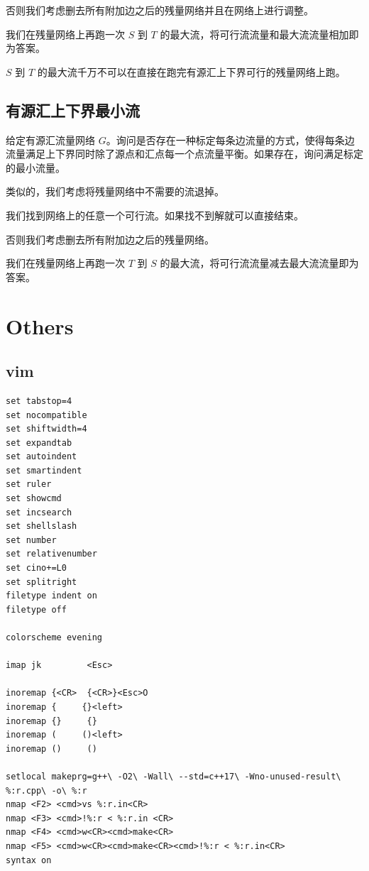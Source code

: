 \documentclass[9pt,landscape]{article}
\begin{document}
\begin{multicols}{2}
否则我们考虑删去所有附加边之后的残量网络并且在网络上进行调整。

我们在残量网络上再跑一次 $S$ 到 $T$ 的最大流，将可行流流量和最大流流量相加即为答案。

$S$ 到 $T$ 的最大流千万不可以在直接在跑完有源汇上下界可行的残量网络上跑。

\subsection{有源汇上下界最小流}

给定有源汇流量网络 $G$。询问是否存在一种标定每条边流量的方式，使得每条边流量满足上下界同时除了源点和汇点每一个点流量平衡。如果存在，询问满足标定的最小流量。

类似的，我们考虑将残量网络中不需要的流退掉。

我们找到网络上的任意一个可行流。如果找不到解就可以直接结束。

否则我们考虑删去所有附加边之后的残量网络。

我们在残量网络上再跑一次 $T$ 到 $S$ 的最大流，将可行流流量减去最大流流量即为答案。


\section{Others}
\subsection{vim}
\begin{lstlisting}
set tabstop=4
set nocompatible
set shiftwidth=4
set expandtab
set autoindent
set smartindent
set ruler
set showcmd
set incsearch
set shellslash
set number
set relativenumber
set cino+=L0
set splitright
filetype indent on
filetype off

colorscheme evening

imap jk         <Esc>

inoremap {<CR>  {<CR>}<Esc>O
inoremap {     {}<left>
inoremap {}     {}
inoremap (     ()<left>
inoremap ()     ()

setlocal makeprg=g++\ -O2\ -Wall\ --std=c++17\ -Wno-unused-result\ %:r.cpp\ -o\ %:r
nmap <F2> <cmd>vs %:r.in<CR>
nmap <F3> <cmd>!%:r < %:r.in <CR>
nmap <F4> <cmd>w<CR><cmd>make<CR>
nmap <F5> <cmd>w<CR><cmd>make<CR><cmd>!%:r < %:r.in<CR>
syntax on
\end{lstlisting}


\end{multicols}
\end{document}
